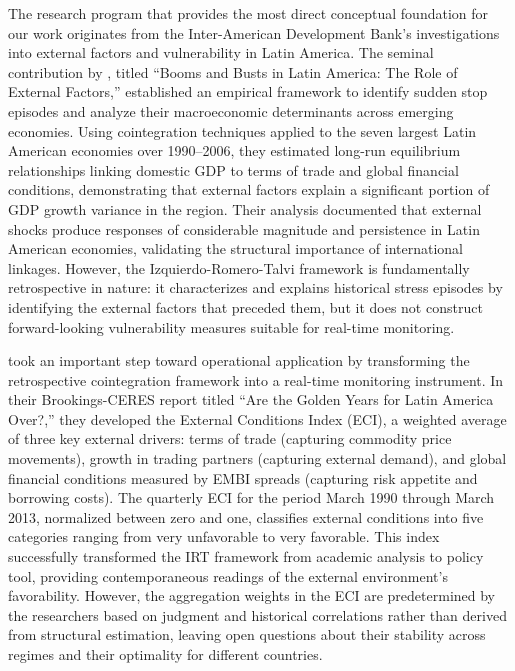 \documentclass[12pt,a4paper]{article}
\numberwithin{equation}{section}
\theoremstyle{definition}
\theoremstyle{remark}
\begin{document}
The research program that provides the most direct conceptual foundation for our work originates from the Inter-American Development Bank's investigations into external factors and vulnerability in Latin America. The seminal contribution by \textcite{izquierdo2008booms}, titled ``Booms and Busts in Latin America: The Role of External Factors,'' established an empirical framework to identify sudden stop episodes and analyze their macroeconomic determinants across emerging economies. Using cointegration techniques applied to the seven largest Latin American economies over 1990--2006, they estimated long-run equilibrium relationships linking domestic GDP to terms of trade and global financial conditions, demonstrating that external factors explain a significant portion of GDP growth variance in the region. Their analysis documented that external shocks produce responses of considerable magnitude and persistence in Latin American economies, validating the structural importance of international linkages. However, the Izquierdo-Romero-Talvi framework is fundamentally retrospective in nature: it characterizes and explains historical stress episodes by identifying the external factors that preceded them, but it does not construct forward-looking vulnerability measures suitable for real-time monitoring.

\textcite{talvi2013latin} took an important step toward operational application by transforming the retrospective cointegration framework into a real-time monitoring instrument. In their Brookings-CERES report titled ``Are the Golden Years for Latin America Over?,'' they developed the External Conditions Index (ECI), a weighted average of three key external drivers: terms of trade (capturing commodity price movements), growth in trading partners (capturing external demand), and global financial conditions measured by EMBI spreads (capturing risk appetite and borrowing costs). The quarterly ECI for the period March 1990 through March 2013, normalized between zero and one, classifies external conditions into five categories ranging from very unfavorable to very favorable. This index successfully transformed the IRT framework from academic analysis to policy tool, providing contemporaneous readings of the external environment's favorability. However, the aggregation weights in the ECI are predetermined by the researchers based on judgment and historical correlations rather than derived from structural estimation, leaving open questions about their stability across regimes and their optimality for different countries.
\end{document}
